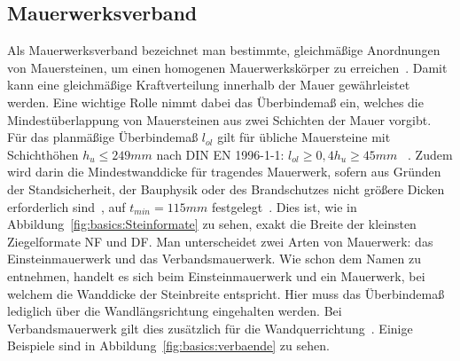 \subsection{Mauerwerksverband}\label{basics:Mauerwerksverband}
Als Mauerwerksverband bezeichnet man bestimmte, gleichmäßige Anordnungen von Mauersteinen, um einen homogenen Mauerwerkskörper zu erreichen~\cite{Mauerwer39:online}.
Damit kann eine gleichmäßige Kraftverteilung innerhalb der Mauer gewährleistet werden.
Eine wichtige Rolle nimmt dabei das Überbindemaß ein, welches die Mindestüberlappung von Mauersteinen aus zwei Schichten der Mauer vorgibt.
Für das planmäßige Überbindemaß \(l_{ol}\) gilt für übliche Mauersteine mit Schichthöhen 
\(h_{u} \leq 249 mm\) 
nach DIN EN 1996-1-1: 
\(l_{ol} \geq 0,4h_{u} \geq 45 mm\)
~\cite{Bemessun72:online}\cite{DIN_EN_1996_1_1}.
Zudem wird darin die Mindestwanddicke für tragendes Mauerwerk, \glqq{}sofern aus Gründen der Standsicherheit, der Bauphysik oder des Brandschutzes nicht größere Dicken erforderlich sind\grqq{}~\cite{Bemessun72:online}, auf 
\(t_{min} = 115 mm\) 
festgelegt~\cite{DIN_EN_1996_1_1}.
Dies ist, wie in Abbildung~\ref{fig:basics:Steinformate} zu sehen, exakt die Breite der kleinsten Ziegelformate NF und DF.
Man unterscheidet zwei Arten von Mauerwerk: das Einsteinmauerwerk und das Verbandsmauerwerk.
Wie schon dem Namen zu entnehmen, handelt es sich beim Einsteinmauerwerk und ein Mauerwerk, bei welchem die Wanddicke der Steinbreite entspricht.
Hier muss das Überbindemaß lediglich über die Wandlängsrichtung eingehalten werden.
Bei Verbandsmauerwerk gilt dies zusätzlich für die Wandquerrichtung~\cite{05maurer1:online}.
Einige Beispiele sind in Abbildung~\ref{fig:basics:verbaende} zu sehen.
